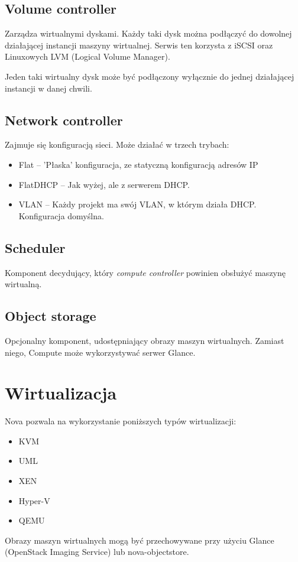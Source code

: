 \documentclass[a4paper,10pt]{article}
\begin{document}
\subsection{Volume controller}
Zarządza wirtualnymi dyskami. Każdy taki dysk można podłączyć do dowolnej działającej instancji maszyny wirtualnej. Serwis ten korzysta z iSCSI oraz Linuxowych LVM (Logical Volume Manager).

Jeden taki wirtualny dysk może być podłączony wyłącznie do jednej działającej instancji w danej chwili.

\subsection{Network controller}
Zajmuje się konfiguracją sieci. Może działać w trzech trybach:
\begin{itemize}
\item Flat -- 'Płaska' konfiguracja, ze statyczną konfiguracją adresów IP
\item FlatDHCP -- Jak wyżej, ale z serwerem DHCP.
\item VLAN -- Każdy projekt ma swój VLAN, w którym działa DHCP. Konfiguracja domyślna.
\end{itemize}

\subsection{Scheduler}
Komponent decydujący, który {\it compute controller} powinien obsłużyć maszynę wirtualną.

\subsection{Object storage}
Opcjonalny komponent, udostępniający obrazy maszyn wirtualnych. Zamiast niego, Compute może wykorzystywać serwer Glance.

\section{Wirtualizacja}

Nova pozwala na wykorzystanie poniższych typów wirtualizacji\cite{nova_doc}:

\begin{itemize}
\item{KVM}
\item{UML}
\item{XEN}
\item{Hyper-V}
\item{QEMU}
\end{itemize}

Obrazy maszyn wirtualnych mogą być przechowywane przy użyciu Glance (OpenStack Imaging Service) lub nova-objectstore.

{}

	
\end{document}
